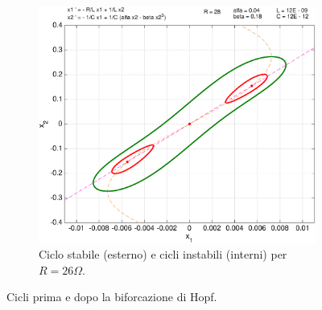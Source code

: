 \begin{enumerate}
\begin{figure}
\begin{subfigure}{0.8\textwidth}
            \includegraphics[width=\textwidth]{pplane/Cycle26ohm}
            \caption{Ciclo stabile (esterno) e cicli instabili (interni) per $R = 26 \Omega$.}
            \label{fig:hopf}
    \end{subfigure}
    \caption{Cicli prima e dopo la biforcazione di Hopf.}
    \label{fig:cicli-hopf}
\end{figure}


\end{enumerate}
